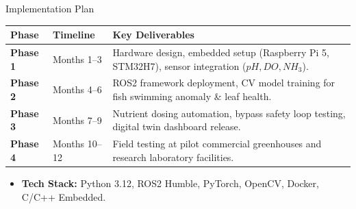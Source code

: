 \documentclass[aspectratio=169, 10pt]{beamer}
\begin{document}
\begin{frame}{Implementation Plan}
  \begin{table}
    \centering
    \small
    \begin{tabular}{llp{7cm}}
      \toprule
      \textbf{Phase} & \textbf{Timeline} & \textbf{Key Deliverables} \\
      \midrule
      \textbf{Phase 1} & Months 1--3 & Hardware design, embedded setup (Raspberry Pi 5, STM32H7), sensor integration ($pH, DO, NH_3$). \\
      \textbf{Phase 2} & Months 4--6 & ROS2 framework deployment, CV model training for fish swimming anomaly \& leaf health. \\
      \textbf{Phase 3} & Months 7--9 & Nutrient dosing automation, bypass safety loop testing, digital twin dashboard release. \\
      \textbf{Phase 4} & Months 10--12 & Field testing at pilot commercial greenhouses and research laboratory facilities. \\
      \bottomrule
    \end{tabular}
  \end{table}
  
  \begin{itemize}
    \item \textbf{Tech Stack:} Python 3.12, ROS2 Humble, PyTorch, OpenCV, Docker, C/C++ Embedded.
  \end{itemize}
\end{frame}
\end{document}
